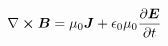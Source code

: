 

\fontsize{25}{25}\selectfont
\[
            
            
            
            
            \curl \vec{B} = \mu_{0} \vec{J} +
            \epsilon_{0} \mu_{0} \pdv{\vec{E}}{t} 
            
            
            
            
            
            
\]

